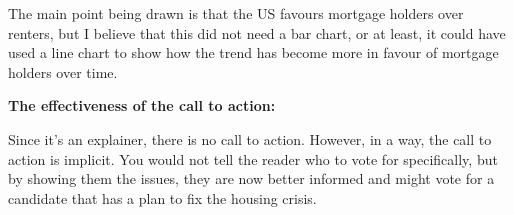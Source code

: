 \documentclass{article}
\begin{document}
The main point being drawn is that the US favours mortgage holders over renters,
but I believe that this did not need a bar chart, or at least, it could have
used a line chart to show how the trend has become more in favour of 
mortgage holders over time.

\textbf{The effectiveness of the call to action:}

Since it's an explainer, there is no call to action. However,
in a way, the call to action is implicit. You would not tell the reader
who to vote for specifically, but by showing them the issues, they are 
now better informed and might vote for a candidate that has a plan to
fix the housing crisis.

\begin{refcontext}[sorting=nyt]
\printbibliography
\end{refcontext}
\end{document}
